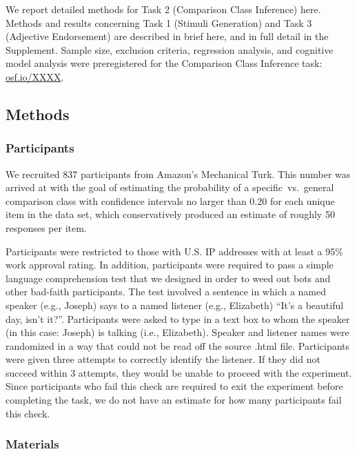 \documentclass[doc]{apa6}
\begin{document}

We report detailed methods for Task 2 (Comparison Class Inference) here. 
Methods and results concerning Task 1 (Stimuli Generation) and Task 3 (Adjective Endorsement) are described in brief here, and in full detail in the Supplement.
Sample size, exclusion criteria, regression analysis, and cognitive model analysis were preregistered for the Comparison Class Inference task: \url{osf.io/XXXX}.


\subsection{Methods}

\subsubsection{Participants}

We recruited 837 participants from Amazon's Mechanical Turk. 
This number was arrived at with the goal of estimating the probability of a specific~vs.~general comparison class with confidence intervals no larger than 0.20 for each unique item in the data set, which conservatively produced an estimate of roughly 50 responses per item.

Participants were restricted to those with U.S. IP addresses with at least a 95\% work approval rating. 
In addition, participants were required to pass a simple language comprehension test that we designed in order to weed out bots and other bad-faith participants. 
The test involved a sentence in which a named speaker (e.g., Joseph) says to a named listener (e.g., Elizabeth) ``It's a beautiful day, isn't it?''. 
Participants were asked to type in a text box to whom the speaker (in this case: Joseph) is talking (i.e., Elizabeth).
Speaker and listener names were randomized in a way that could not be read off the source .html file.
Participants were given three attempts to correctly identify the listener. 
If they did not succeed within 3 attempts, they would be unable to proceed with the experiment.
Since participants who fail this check are required to exit the experiment before completing the task, we do not have an estimate for how many participants fail this check. 

\subsubsection{Materials}
\end{document}
